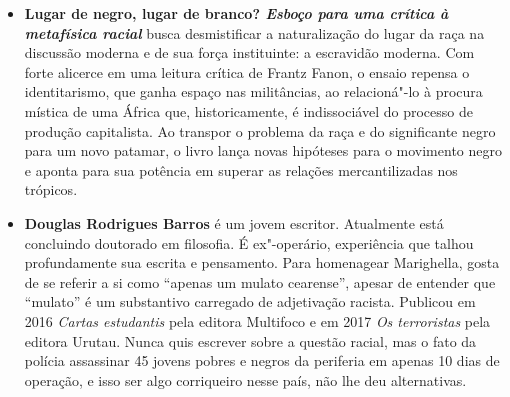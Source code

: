 \begin{itemize}


\item \textbf{Lugar de negro, lugar de branco? \emph{Esboço para uma crítica à metafísica racial}} busca desmistificar a naturalização do lugar da raça na discussão moderna e de sua força instituinte: a escravidão moderna. Com forte alicerce em uma leitura crítica de Frantz Fanon, o ensaio repensa o identitarismo, que ganha espaço nas militâncias, ao relacioná"-lo à procura mística de uma África que, historicamente, é indissociável do processo de produção capitalista.
 Ao transpor o problema da raça e do significante negro para um novo patamar, o livro lança novas hipóteses para o movimento negro e aponta para sua potência em superar as relações mercantilizadas nos trópicos.
  
\item \textbf{Douglas Rodrigues Barros} é um jovem escritor. Atualmente está concluindo doutorado
em filosofia. É ex"-operário, experiência que talhou profundamente sua escrita e
pensamento. Para homenagear Marighella, gosta de se referir a si como ``apenas um
mulato cearense'', apesar de entender que ``mulato'' é um substantivo carregado de
adjetivação racista. Publicou em 2016 \emph{Cartas estudantis} pela editora Multifoco e em
2017 \emph{Os terroristas} pela editora Urutau. Nunca quis escrever sobre a questão racial, mas
o fato da polícia assassinar 45 jovens pobres e negros da periferia em apenas 10 dias de
operação, e isso ser algo corriqueiro nesse país, não lhe deu alternativas.

\end{itemize}